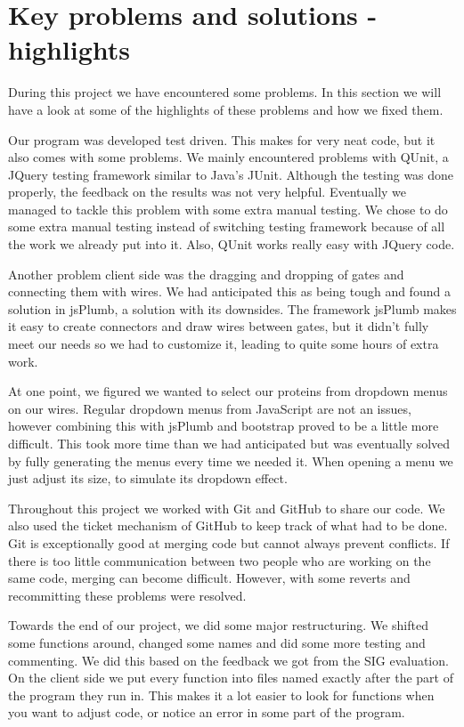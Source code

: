 \documentclass[a4paper]{article}
\begin{document}
\section{Key problems and solutions - highlights}

During this project we have encountered some problems. In this section we will have a look at some of the highlights of these problems and how we fixed them.

Our program was developed test driven. This makes for very neat code, but it also comes with some problems. We mainly encountered problems with QUnit, a JQuery testing framework similar to Java's JUnit. Although the testing was done properly, the feedback on the results was not very helpful. Eventually we managed to tackle this problem with some extra manual testing. We chose to do some extra manual testing instead of switching testing framework because of all the work we already put into it. Also, QUnit works really easy with JQuery code.

Another problem client side was the dragging and dropping of gates and connecting them with wires. We had anticipated this as being tough and found a solution in jsPlumb, a solution with its downsides. The framework jsPlumb makes it easy to create connectors and draw wires between gates, but it didn't fully meet our needs so we had to customize it, leading to quite some hours of extra work.

At one point, we figured we wanted to select our proteins from dropdown menus on our wires. Regular dropdown menus from JavaScript are not an issues, however combining this with jsPlumb and bootstrap proved to be a little more difficult. This took more time than we had anticipated but was eventually solved by fully generating the menus every time we needed it. When opening a menu we just adjust its size, to simulate its dropdown effect.

Throughout this project we worked with Git and GitHub to share our code. We also used the ticket mechanism of GitHub to keep track of what had to be done. Git is exceptionally good at merging code but cannot always prevent conflicts. If there is too little communication between two people who are working on the same code, merging can become difficult. However, with some reverts and recommitting these problems were resolved.

Towards the end of our project, we did some major restructuring. We shifted some functions around, changed some names and did some more testing and commenting. We did this based on the feedback we got from the SIG evaluation. On the client side we put every function into files named exactly after the part of the program they run in. This makes it a lot easier to look for functions when you want to adjust code, or notice an error in some part of the program.
\end{document}
